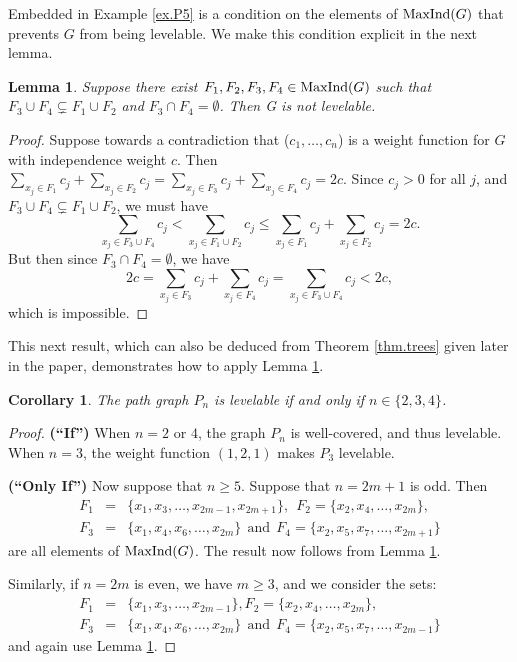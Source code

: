 \documentclass[12pt]{amsart}
\numberwithin{equation}{section}
\newtheorem{lemma}[theorem]{Lemma}
\newtheorem{corollary}[theorem]{Corollary}
\theoremstyle{definition}
\newcounter{i} %
\begin{document}
Embedded in Example \ref{ex.P5} is a condition on
the elements of ${\rm MaxInd}(G)$
that prevents $G$ from being levelable.  We make this condition
explicit in the next lemma.

\begin{lemma} \label{lem.noncondition}
    Suppose there exist $F_1, F_2, F_3, F_4 \in {\rm MaxInd}(G)$ such that $F_3 \cup F_4 \subsetneq F_1 \cup F_2$ and $F_3 \cap F_4 = \emptyset$. Then G is not levelable.
\end{lemma}

\begin{proof}
    Suppose towards a contradiction that ($c_1,\dots, c_n$) is a weight function for $G$ with independence weight $c$. Then $\sum_{x_j \in F_1} c_j + \sum_{x_j \in F_2} c_j  = \sum_{x_j \in F_3} c_j + \sum_{x_j \in F_4} c_j =2c$. Since $c_j >0$ for all $j$, and $F_3 \cup F_4 \subsetneq F_1 \cup F_2$, we must have 
    \[
    \sum_{x_{j} \in F_3 \cup F_4} c_j < \sum_{x_{j} \in F_1 \cup F_2} c_j \leq \sum_{x_{j} \in F_1} c_j + \sum_{x_{j} \in F_2} c_j = 2c.
    \]
    But then since $F_3 \cap F_4 = \emptyset$, we have 
    \[ 2c = \sum_{x_{j} \in F_3} c_j + \sum_{x_{j} \in F_4} c_j = \sum_{x_{j} \in F_3 \cup F_4} c_j < 2c,
    \]
    which is impossible.
\end{proof}

This next result, which
can also be deduced from
Theorem \ref{thm.trees} given later in the paper, demonstrates how to apply Lemma \ref{lem.noncondition}.


\begin{corollary}\label{cor.paths}
    The path graph $P_n$ is levelable
    if and only if $n\in\{2,3,4\}$.
\end{corollary}

\begin{proof}
{\bf (``If'')} 
    When $n=2$ or $4$, the graph $P_n$ is well-covered, and thus
    levelable.  When $n=3$, the weight function $(1,2,1)$
    makes $P_3$ levelable.

    {\bf (``Only If'')}
    Now suppose that $n \geq 5$.  Suppose that $n = 2m+1$
    is odd.  Then 
    \begin{eqnarray*}
    F_1 &= &\{x_1,x_3,\ldots,x_{2m-1},x_{2m+1}\}, ~~F_2 = \{x_2,x_4,\ldots,x_{2m}\},\\
    F_3 & =& \{x_1,x_4,x_6,\ldots,x_{2m}\} 
    ~~\mbox{and}~~
    F_4  =  \{x_2,x_5,x_7,\ldots,x_{2m+1}\}
    \end{eqnarray*}
    are all elements of ${\rm MaxInd}(G)$.  The result now
    follows from Lemma \ref{lem.noncondition}.

    Similarly, if $n =2m$ is even, we have $m \geq 3$, and
    we consider the sets:
    \begin{eqnarray*}
    F_1 &= &\{x_1,x_3,\ldots,x_{2m-1}\}, 
    F_2 = \{x_2,x_4,\ldots,x_{2m}\}, \\
    F_3 & =& \{x_1,x_4,x_6,\ldots,x_{2m}\} 
    ~~\mbox{and}~~
    F_4  =  \{x_2,x_5,x_7,\ldots,x_{2m-1}\}
    \end{eqnarray*}
    and again use Lemma \ref{lem.noncondition}.
\end{proof}
\end{document}
